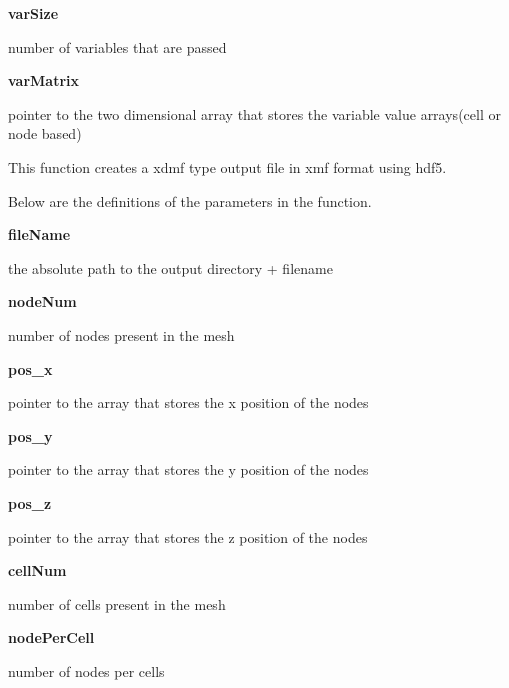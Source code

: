 \documentclass{article}
\begin{document}
        {\bf varSize} \par number of variables that are passed 
\medskip
        
        {\bf varMatrix} \par pointer to the two dimensional array that stores the variable value arrays(cell or node based) 

\newpage

\bigskip

        \par This function creates a xdmf type output file in xmf format using hdf5.
\bigskip
        
        \par Below are the definitions of the parameters in the function.
\medskip

        {\bf fileName}  \par the absolute path to the output directory + filename
\medskip
        
        {\bf nodeNum} \par number of nodes present in the mesh
\medskip
        
        {\bf pos\_x} \par pointer to the array that stores the x position of the nodes
\medskip
        
        {\bf pos\_y} \par pointer to the array that stores the y position of the nodes
\medskip
        
        {\bf pos\_z} \par pointer to the array that stores the z position of the nodes
\medskip
        
        {\bf cellNum} \par number of cells present in the mesh
\medskip
        
        {\bf nodePerCell} \par number of nodes per cells 
\medskip
        
\end{document}
